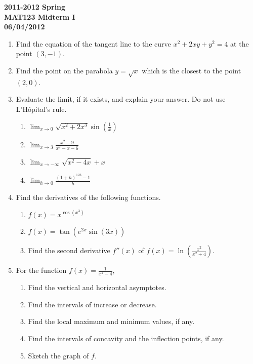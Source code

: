 \documentclass[a4paper, 12pt]{article}
\begin{document}
\begin{center}
\textbf{2011-2012 Spring \\MAT123 Midterm I\\06/04/2012}
\end{center}

\begin{enumerate}[leftmargin=*,label=\textbf{\arabic*.}]

\item Find the equation of the tangent line to the curve $x^2+2xy+y^2=4$ at the point $(3,-1)$.

\item Find the point on the parabola $y=\sqrt x$ which is the closest to the point $(2,0)$.

\item Evaluate the limit, if it exists, and explain your answer. Do not use L'Hôpital's rule.

\begin{enumerate}[leftmargin=*,label=\textbf{\alph*.}]
\item $\displaystyle\lim_{x\to0}\sqrt{x^2+2x^3} \sin\left(\frac1x\right)$ \ \ \ \item $\displaystyle \lim_{x\to3}\frac{x^2-9}{x^2-x-6}$ \ \ \ \item $\displaystyle \lim_{x\to-\infty}\sqrt{x^2-4x}+x$

\item $\displaystyle\lim_{h\to0}\frac{(1+h)^{123}-1}{h}$
\end{enumerate}

\item Find the derivatives of the following functions.

\begin{enumerate}[leftmargin=*,label=\textbf{\alph*.}]
\item $f(x)=x^{\cos\left(x^3\right)}$ \ \ \ \item $f(x) = \tan\left( e^{2x}\sin(3x)\right)$

\item Find the second derivative $f''(x)$ of $\displaystyle f(x) =\ln\left(\frac{x^2}{x^2+4}\right)$.
\end{enumerate}

\item For the function $\displaystyle f(x)=\frac{1}{x^2-4}$,

\begin{enumerate}[leftmargin=*,label=\textbf{\alph*.}]
\item Find the vertical and horizontal asymptotes.
\item Find the intervals of increase or decrease.
\item Find the local maximum and minimum values, if any.
\item Find the intervals of concavity and the inflection points, if any.
\item Sketch the graph of $f$.
\end{enumerate}

\end{enumerate}
\end{document}
